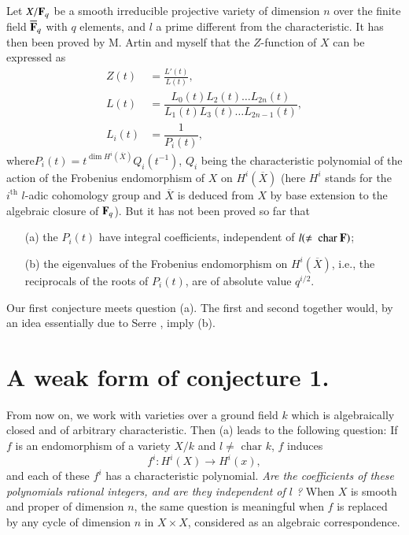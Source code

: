 Let $X/\mathbf{F}_{q}$ be a smooth irreducible projective variety of dimension $n$ over the finite field $\overline{\mathbf{F}}_{q}$ with $q$ elements, and $l$ a prime different from the characteristic. It has then been proved by M. Artin and myself that the $Z$-function of $X$ can be expressed as
\begin{align*}
Z(t) &= \frac{L'(t)}{L(t)},\\[3pt]
L(t) &= \dfrac{L_{0}(t)L_{2}(t)\ldots L_{2n}(t)}{L_{1}(t)L_{3}(t)\ldots L_{2n-1}(t)},\\[3pt]
L_{i}(t) &= \dfrac{1}{P_{i}(t)},
\end{align*}
where\pageoriginale $P_{i}(t)=t^{\dim H^{i}(\overline{X})}Q_{i}(t^{-1})$, $Q_{i}$ being the characteristic polynomial of the action of the Frobenius endomorphism of $X$ on $H^{i}(\overline{X})$ (here $H^{i}$ stands for the $i^{\text{th}}$ $l$-adic cohomology group and $\overline{X}$ is deduced from $X$ by base extension to the algebraic closure of $\mathbf{F}_{q}$). But it has not been proved so far that
\begin{itemize}
\item[(a)] the $P_{i}(t)$ have integral coefficients, independent of $l(\neq \text{ char } \mathbf{F})$;

\item[(b)] the eigenvalues of the Frobenius endomorphism on $H^{i}(\overline{X})$, i.e., the reciprocals of the roots of $P_{i}(t)$, are of absolute value $q^{i/2}$.
\end{itemize}

Our first conjecture meets question (a). The first and second together would, by an idea essentially due to Serre \cite{art09-key4}, imply (b).

\section{A weak form of conjecture 1.}\label{art09-sec2}

From now on, we work with varieties over a ground field $k$ which is algebraically closed and of arbitrary characteristic. Then (a) leads to the following question: If $f$ is an endomorphism of a variety $X/k$ and $l\neq \text{ char } k$, $f$ induces
$$
f^{i}:H^{i}(X)\to H^{i}(x),
$$
and each of these $f^{i}$ has a characteristic polynomial. {\em Are the coefficients of these polynomials rational integers, and are they independent of $l$ ?} When $X$ is smooth and proper of dimension $n$, the same question is meaningful when $f$ is replaced by any cycle of dimension $n$ in $X\times X$, considered as an algebraic correspondence.

